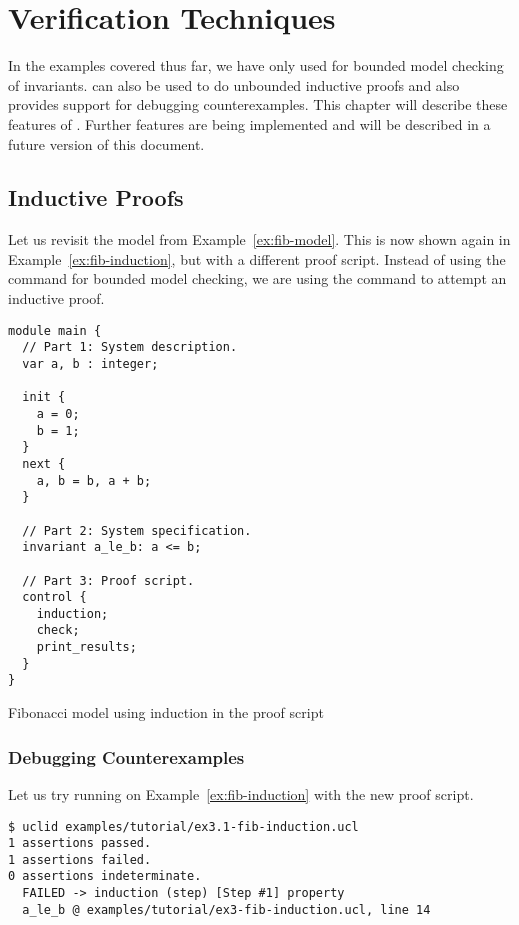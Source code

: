 \chapter{Verification Techniques}
\label{ch:verif}

In the examples covered thus far, we have only used \uclid{} for bounded model checking of invariants. 
\uclid{} can also be used to do unbounded inductive proofs and also provides support for debugging counterexamples. This chapter will describe these features of \uclid{}. Further features are being implemented and will be described in a future version of this document.

\section{Inductive Proofs} %
Let us revisit the model from Example~\ref{ex:fib-model}. This is now shown again in Example~\ref{ex:fib-induction}, but with a different proof script. Instead of using the  command for bounded model checking, we are using the  command to attempt an inductive proof.

\begin{uclidlisting}[htbp]
\begin{lstlisting}[language=uclid,style=uclidstyle]
module main {
  // Part 1: System description.
  var a, b : integer;

  init {
    a = 0;
    b = 1;
  }
  next {
    a, b = b, a + b;
  }

  // Part 2: System specification.
  invariant a_le_b: a <= b;

  // Part 3: Proof script.
  control {
    induction;
    check;
    print_results;
  }
}
\end{lstlisting}
\label{ex:fib-induction}
\caption{\uclid{} Fibonacci model using induction in the proof script}
\end{uclidlisting}

\subsection{Debugging Counterexamples}

Let us try running \uclid{} on Example~\ref{ex:fib-induction} with the new proof script.
\begin{Verbatim}[frame=single, samepage=true]
$ uclid examples/tutorial/ex3.1-fib-induction.ucl 
1 assertions passed.
1 assertions failed.
0 assertions indeterminate.
  FAILED -> induction (step) [Step #1] property 
  a_le_b @ examples/tutorial/ex3-fib-induction.ucl, line 14
\end{Verbatim}

